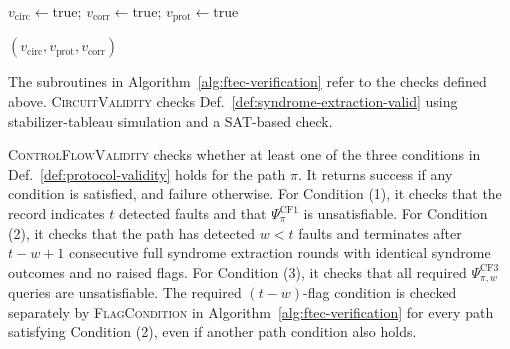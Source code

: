 \documentclass[acmsmall,screen,review,anonymous,nonacm]{acmart}
\begin{document}
\begin{algorithm}[t]

\DontPrintSemicolon
\SetAlgoLined
\SetAlgoNoEnd
\caption{Verification of a flagged error correction protocol}
\label{alg:ftec-verification}

$v_{\mathrm{circ}}\gets\mathrm{true}$; 
$v_{\mathrm{corr}}\gets\mathrm{true}$;
$v_{\mathrm{prot}}\gets\mathrm{true}$\;



\Return $(v_{\mathrm{circ}},v_{\mathrm{prot}},v_{\mathrm{corr}})$
\end{algorithm}

The subroutines in Algorithm~\ref{alg:ftec-verification} refer to the checks
defined above. \textsc{CircuitValidity} checks
Def.~\ref{def:syndrome-extraction-valid} using stabilizer-tableau simulation and a SAT-based check.


\textsc{ControlFlowValidity} checks whether at least one of the three
conditions in Def.~\ref{def:protocol-validity} holds for the path $\pi$.
It returns success if any condition is satisfied, and failure otherwise.
For Condition (1), it checks that the record indicates $t$ detected
faults and that $\Psi^{\mathrm{CF1}}_\pi$ is unsatisfiable.
For Condition (2), it checks that the path has detected $w<t$ faults
and terminates after $t-w+1$ consecutive full syndrome extraction rounds
with identical syndrome outcomes and no raised flags.
For Condition (3), it checks that all required
$\Psi^{\mathrm{CF3}}_{\pi,w}$ queries are unsatisfiable.
The required $(t-w)$-flag condition is checked separately by
\textsc{FlagCondition} in Algorithm~\ref{alg:ftec-verification} for every
path satisfying Condition (2), even if another path condition also holds.
\end{document}
